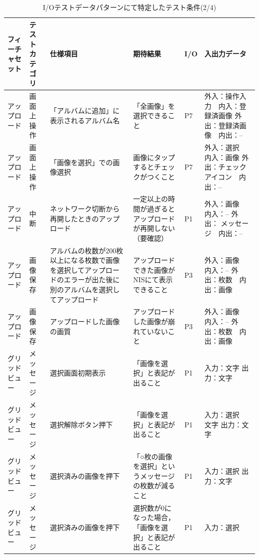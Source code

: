 \begin{table}[htbp]

  \scriptsize
  \centering
  \caption{I/Oテストデータパターンにて特定したテスト条件(2/4)}
  \begin{tabular}{|p{8em}|p{7em}|p{9em}|p{9em}|p{3em}|p{12em}|}
\cline{1-6}   フィーチャセット & テストカテゴリ  & 仕様項目 & 期待結果  & I/O   & 入出力データ \bigstrut\\
    \hline
    アップロード & 画面上操作 & \multicolumn{1}{p{7.5em}|}{「アルバムに追加」に表示されるアルバム名} & 「全画像」を選択できること & P7    & 外入：操作入力　内入：登録済画像
外出：登録済画像　内出：-- \bigstrut\\
    \hline
    アップロード & 画面上操作 & 「画像を選択」での画像選択 & 画像にタップするとチェックがつくこと & P7    & 外入：選択　内入：画像
外出：チェックアイコン　内出：-- \bigstrut\\
    \hline
    アップロード & 中断    & \multicolumn{1}{p{7.5em}|}{ネットワーク切断から再開したときのアップロード} & 一定以上の時間が過ぎるとアップロードが再開しない（要確認） & P1    & 外入：画像　内入：--
外出： メッセージ　内出：-- \bigstrut\\
    \hline
    アップロード & 画像保存  & \multicolumn{1}{p{7.5em}|}{アルバムの枚数が200枚以上になる枚数で画像を選択してアップロードのエラーが出た後に別のアルバムを選択してアップロード} & アップロードできた画像がNISにて表示できること & P3    & 外入：画像　内入：--
外出：枚数　内出：画像 \bigstrut\\
    \hline
    アップロード & 画像保存 & \multicolumn{1}{p{7.5em}|}{アップロードした画像の画質} & アップロードした画像が崩れていないこと & P3    & 外入：画像　内入：--
外出：枚数　内出：画像 \bigstrut\\
    \hline
    グリッドビュー & メッセージ & 選択画面初期表示 & 「画像を選択」と表記が出ること & P1    & 入力：文字
出力：文字 \bigstrut\\
    \hline
    グリッドビュー & メッセージ & 選択解除ボタン押下 & 「画像を選択」と表記が出ること & P1    & 入力：選択　文字
出力：文字 \bigstrut\\
    \hline
    グリッドビュー & メッセージ & \multicolumn{1}{p{7.5em}|}{選択済みの画像を押下} & 「○枚の画像を選択」というメッセージの枚数が減ること & P1    & 入力：選択
出力：文字 \bigstrut\\
    \hline
    グリッドビュー & メッセージ & \multicolumn{1}{p{7.5em}|}{選択済みの画像を押下} & 選択数が0になった場合，「画像を選択」と表記が出ること & P1    & 入力：選択

\end{tabular}
\end{table}
